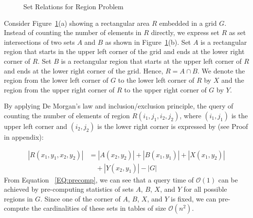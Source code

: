 \documentclass[AMA,LATO1COL]{WileyNJD-v2}
\newcommand\bigo{\mathcal O}
\begin{document}
\begin{figure}[h]
     \begin{center}
\end{center}
\vspace{-10pt}
\caption{Set Relations for Region Problem}\label{fig:example}
\end{figure}

Consider Figure~\ref{fig:example}(a) showing a rectangular area $R$ embedded in a grid $G$. Instead of counting the number of elements in $R$ directly, we express set $R$ as set intersections of two sets $A$ and $B$ as shown in Figure~\ref{fig:example}(b). Set $A$ is a rectangular region that starts in the upper left corner of the grid and ends at the lower right corner of $R$. Set $B$ is a rectangular region that starts at the upper left corner of $R$ and ends at the lower right corner of the grid. Hence, $R=A \cap B$. We denote the region from the lower left corner of $G$ to the lower left corner of $R$ by $X$ and the region from the upper right corner of $R$ to the upper right corner of $G$ by $Y$.

 By applying De Morgan's law and inclusion/exclusion principle, the query of counting the number of elements of region $R(i_1,j_1,i_2,j_2)$, where $(i_1,j_1)$ is the upper left corner and $(i_2,j_2)$ is the lower right corner is expressed by (see Proof in appendix):

\small
\begin{equation}
\label{EQ:precomp}
\begin{split}
|R(x_1,y_1,x_2,y_2)|& = |A(x_2,y_2)| + |B(x_1,y_1)| + |X(x_1,y_2)| \\& \quad + |Y(x_2,y_1)| - |G|
\end{split}
\end{equation}
\normalsize
From Equation ~\ref{EQ:precomp}, we can see that a query time of $\bigo(1)$ can be achieved by pre-computing statistics of sets $A$, $B$, $X$, and $Y$ for all possible regions in $G$. Since one of the corner of $A$, $B$, $X$, and $Y$ is fixed, we can pre-compute the cardinalities of these sets in tables of size $\bigo(n^2)$.
\end{document}
